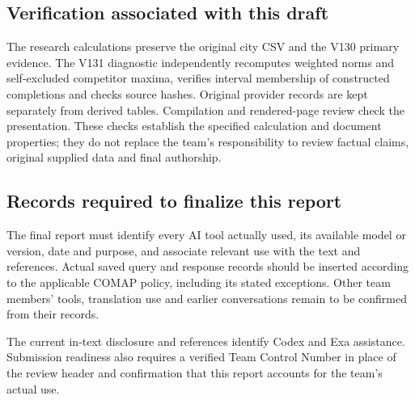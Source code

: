 \subsection*{Verification associated with this draft}
The research calculations preserve the original city CSV and the V130 primary
evidence. The V131 diagnostic independently recomputes weighted norms and
self-excluded competitor maxima, verifies interval membership of constructed
completions and checks source hashes. Original provider records are kept
separately from derived tables. Compilation and rendered-page review check the
presentation. These checks establish the specified calculation and document
properties; they do not replace the team's responsibility to review factual
claims, original supplied data and final authorship.

\subsection*{Records required to finalize this report}
The final report must identify every AI tool actually used, its available
model or version, date and purpose, and associate relevant use with the text
and references. Actual saved query and response records should be inserted
according to the applicable COMAP policy, including its stated exceptions.
Other team members' tools, translation use and earlier conversations remain
to be confirmed from their records.

The current in-text disclosure and references identify Codex and Exa
assistance. Submission readiness also requires a verified Team Control Number
in place of the review header and confirmation that this report accounts for
the team's actual use.
